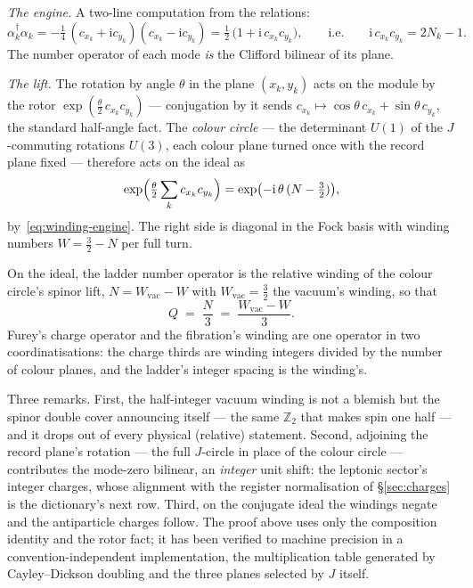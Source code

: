 \emph{The engine.} A two-line computation from the relations:
\begin{equation}
\alpha_{k}^{\dagger}\alpha_{k}
 = -\tfrac14\,(c_{x_{k}} + \mathrm{i} c_{y_{k}})(c_{x_{k}} - \mathrm{i} c_{y_{k}})
 = \tfrac12\,\bigl(1 + \mathrm{i}\, c_{x_{k}} c_{y_{k}}\bigr),
\qquad\text{i.e.}\qquad
\mathrm{i}\, c_{x_{k}} c_{y_{k}} = 2 N_{k} - 1 .
\label{eq:winding-engine}
\end{equation}
The number operator of each mode \emph{is} the Clifford bilinear of its plane.

\emph{The lift.} The rotation by angle $\theta$ in the plane $(x_{k}, y_{k})$ acts on the
module by the rotor $\exp(\tfrac{\theta}{2}\, c_{x_{k}} c_{y_{k}})$ --- conjugation by it sends
$c_{x_{k}} \mapsto \cos\theta\, c_{x_{k}} + \sin\theta\, c_{y_{k}}$, the standard half-angle
fact. The \emph{colour circle} --- the determinant $U(1)$ of the $J$-commuting rotations
$U(3)$, each colour plane turned once with the record plane fixed --- therefore acts on the
ideal as
\begin{equation}
\exp\Bigl(\tfrac{\theta}{2} \sum_{k} c_{x_{k}} c_{y_{k}}\Bigr)
 = \exp\bigl(-\mathrm{i}\,\theta\,(N - \tfrac32)\bigr),
\label{eq:winding-lift}
\end{equation}
by~\eqref{eq:winding-engine}. The right side is diagonal in the Fock basis with winding numbers
$W = \tfrac32 - N$ per full turn.

\begin{lemma}\label{lem:winding-number}
On the ideal, the ladder number operator is the relative winding of the colour circle's spinor
lift, $N = W_{\mathrm{vac}} - W$ with $W_{\mathrm{vac}} = \tfrac32$ the vacuum's winding, so that
\begin{equation}
Q \;=\; \frac{N}{3} \;=\; \frac{W_{\mathrm{vac}} - W}{3}.
\end{equation}
Furey's charge operator and the fibration's winding are one operator in two coordinatisations:
the charge thirds are winding integers divided by the number of colour planes, and the ladder's
integer spacing is the winding's.
\end{lemma}

Three remarks. First, the half-integer vacuum winding is not a blemish but the spinor double
cover announcing itself --- the same $\mathbb{Z}_{2}$ that makes spin one half --- and it drops
out of every physical (relative) statement. Second, adjoining the record plane's rotation ---
the full $J$-circle in place of the colour circle --- contributes the mode-zero bilinear, an
\emph{integer} unit shift: the leptonic sector's integer charges, whose alignment with the
register normalisation of \S\ref{sec:charges} is the dictionary's next row. Third, on the
conjugate ideal the windings negate and the antiparticle charges follow. The proof above uses
only the composition identity and the rotor fact; it has been verified to machine precision in
a convention-independent implementation, the multiplication table generated by Cayley--Dickson
doubling and the three planes selected by $J$ itself.
